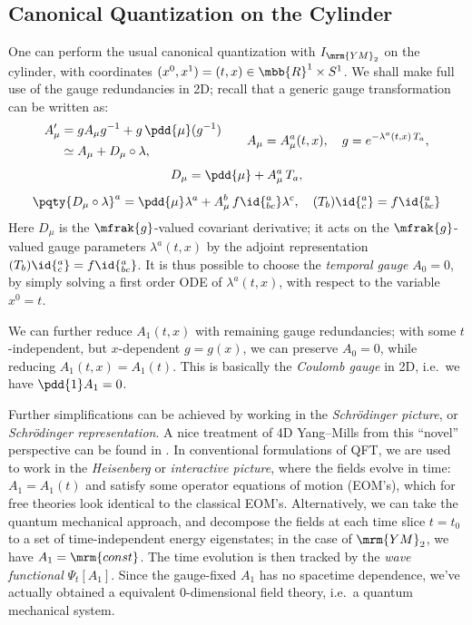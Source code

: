 \documentclass[a4paper
	,10pt
]{article}
\newcommand{\YM}{{\ensuremath{\mrm{YM}_2}}\xspace}
\begin{document}
\subsection{Canonical Quantization on the Cylinder}
	One can perform the usual canonical quantization with $I_\YM$ on the cylinder, with coordinates $(x^0,x^1) = (t,x) \in \mbb{R}^1\times S^1$. We shall make full use of the gauge redundancies in 2D; recall that a generic gauge transformation can be written as:
	\begin{equation}
	\begin{aligned}
		A'_\mu
		&= g A_\mu g^{-1}
			+ g\,\pdd{\mu} (g^{-1}) \\
		&\simeq A_\mu
			+ D_\mu\circ\lambda,
	\end{aligned}
	\qquad
		A_\mu = A^a_\mu(t,x),
	\quad
		g = e^{-\lambda^a(t,x)\,T_a},
	\end{equation}
	\vspace{-1.2\baselineskip}
	\begin{gather}
		D_\mu = \pdd{\mu} + A_\mu^a\,T_a,
	\\[1ex]
		\pqty{D_\mu\circ\lambda}^a
		= \pdd{\mu} \lambda^a
			+ A_\mu^b\,f\id{^a_{bc}} \lambda^c,
	\quad
		(T_b)\id{^a_c} = f\id{^a_{bc}}
	\end{gather}
	Here $D_\mu$ is the $\mfrak{g}$-valued covariant derivative; it acts on the $\mfrak{g}$-valued gauge parameters $\lambda^a(t,x)$ by the adjoint representation $(T_b)\id{^a_c} = f\id{^a_{bc}}$. 
	It is thus possible to choose the \textit{temporal gauge} $A_0 = 0$, by simply solving a first order ODE of $\lambda^a(t,x)$, with respect to the variable $x^0 = t$. 
	
	We can further reduce $A_1(t,x)$ with remaining gauge redundancies; with some $t$-independent, but $x$-dependent $g = g(x)$, we can preserve $A_0 = 0$, while reducing $A_1(t,x) = A_1(t)$. This is basically the \textit{Coulomb gauge} in 2D, i.e.~we have $\pdd{1} A_1 = 0$. 
	
	Further simplifications can be achieved by working in the \textit{Schr\"odinger picture}, or \textit{Schr\"odinger representation}. A nice treatment of 4D Yang--Mills from this ``novel'' perspective can be found in \cite{Hatfield:234595}. In conventional formulations of QFT, we are used to work in the \textit{Heisenberg} or \textit{interactive picture}, where the fields evolve in time: $A_1 = A_1(t)$ and satisfy some operator equations of motion (EOM's), which for free theories look identical to the classical EOM's. Alternatively, we can take the quantum mechanical approach, and decompose the fields at each time slice $t = t_0$ to a set of time-independent energy eigenstates; in the case of \YM, we have $A_1 = \mrm{const}$. 
	The time evolution is then tracked by the \textit{wave functional} $\Psi_t[A_1]$. Since the gauge-fixed $A_1$ has no spacetime dependence, we've actually obtained a equivalent 0-dimensional field theory, i.e.~a quantum mechanical system. 
	
\end{document}
